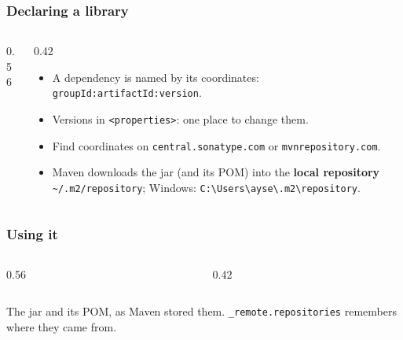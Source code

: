 \documentclass[aspectratio=169,10pt,compress]{beamer}
\begin{document}
\begin{frame}[t,fragile] \frametitle{Declaring a library}
  \begin{columns}[T]
    \begin{column}{0.56\textwidth}
    \end{column}
    \begin{column}{0.42\textwidth}
      \begin{itemize}\small
        \item A dependency is named by its coordinates: \texttt{groupId:artifactId:version}.
        \item Versions in \texttt{<properties>}: one place to change them.
        \item Find coordinates on \texttt{central.sonatype.com} or \texttt{mvnrepository.com}.
        \item Maven downloads the jar (and its POM) into the \textbf{local repository} \texttt{\textasciitilde/.m2/repository}; Windows: \texttt{C:\textbackslash Users\textbackslash ayse\textbackslash .m2\textbackslash repository}.
      \end{itemize}
    \end{column}
  \end{columns}
\end{frame}




\begin{frame}[t,fragile] \frametitle{Using it}
  \begin{columns}[T]
    \begin{column}{0.56\textwidth}
    \end{column}
    \begin{column}{0.42\textwidth}
    \end{column}
  \end{columns}

  \vspace{0.1em}
  \small
  The jar and its POM, as Maven stored them. \texttt{\_remote.repositories} remembers where they came from.
\end{frame}
\end{document}
